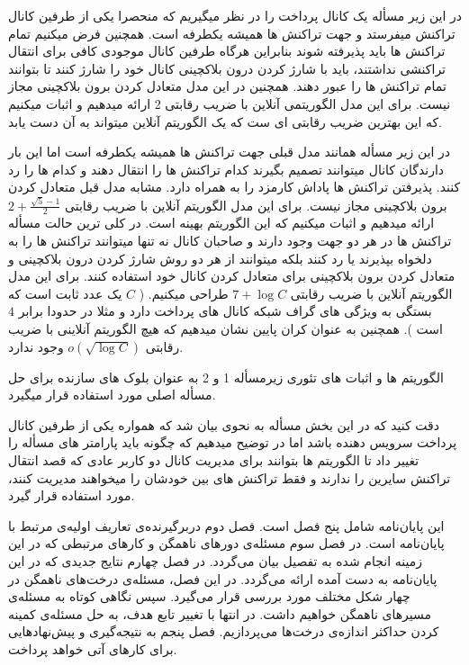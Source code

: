  در این زیر مسأله یک کانال پرداخت را در نظر میگیریم که منحصرا یکی از طرفین کانال  تراکنش میفرستد و جهت تراکنش ها همیشه یکطرفه است. همچنین فرض میکنیم تمام تراکنش ها باید پذیرفته شوند بنابراین هرگاه طرفین کانال موجودی کافی برای انتقال تراکنشی نداشتند، باید با  شارژ کردن درون بلاکچینی کانال خود را شارژ کنند تا بتوانند تمام تراکنش ها را عبور دهند. همچنین در این مدل متعادل کردن برون بلاکچینی مجاز نیست. برای این مدل الگوریتمی آنلاین با ضریب رقابتی  2 ارائه میدهیم و اثبات میکنیم که این بهترین ضریب رقابتی ای ست که یک الگوریتم آنلاین میتواند به آن دست یابد.

در این زیر مسأله همانند مدل قبلی جهت تراکنش ها همیشه یکطرفه است اما این بار دارندگان کانال میتوانند تصمیم بگیرند کدام تراکنش ها را انتقال دهند و کدام ها را رد کنند. پذیرفتن تراکنش ها پاداش کارمزد را به همراه دارد. مشابه مدل قبل
متعادل کردن برون بلاکچینی مجاز نیست. برای این مدل الگوریتم آنلاین با ضریب رقابتی
$2+\frac{\sqrt{5}-1}{2}$  
ارائه میدهیم و اثبات میکنیم که این الگوریتم بهینه است.
در کلی ترین حالت مسأله تراکنش ها در هر دو جهت وجود دارند و صاحبان کانال نه تنها میتوانند تراکنش ها را به دلخواه بپذیرند یا رد کنند بلکه میتوانند از هر دو روش شارژ کردن درون بلاکچینی و متعادل کردن برون بلاکچینی برای متعادل کردن کانال خود استفاده کنند. برای این مدل الگوریتم آنلاین با ضریب رقابتی
 $7+\log{C}$
طراحی میکنیم.
(
$C$
یک عدد ثابت است که بستگی به ویژگی های گراف شبکه کانال های پرداخت دارد و مثلا در  حدودا برابر $4$ است
). 
همچنین به عنوان کران پایین نشان میدهیم که هیچ الگوریتم آنلاینی با ضریب رقابتی 
$o(\sqrt{\log{C}})$
 وجود ندارد.

الگوریتم ها و اثبات های تئوری زیرمسأله 1 و 2 به عنوان بلوک های سازنده برای حل مسأله اصلی مورد استفاده قرار میگیرد. 

دقت کنید که در این بخش مسأله به نحوی بیان شد که همواره یکی از طرفین کانال پرداخت سرویس دهنده باشد اما در  توضیح میدهیم که چگونه باید پارامتر های مسأله را تغییر داد تا الگوریتم ها بتوانند برای مدیریت کانال دو کاربر عادی که قصد انتقال تراکنش سایرین را ندارند و فقط تراکنش های بین خودشان را میخواهند مدیریت کنند، مورد استفاده قرار گیرد.



این پایان‌نامه شامل پنج فصل است. 
فصل دوم دربرگیرنده‌ی تعاریف اولیه‌ی مرتبط با پایان‌نامه است. 
در فصل سوم مسئله‌ی دورهای ناهمگن و کارهای مرتبطی که در این زمینه انجام شده به تفصیل بیان می‌گردد. 
در فصل چهارم نتایج جدیدی که در این پایان‌نامه به دست آمده ارائه می‌گردد. در این فصل، مسئله‌ی درخت‌های ناهمگن در چهار شکل مختلف مورد بررسی قرار می‌گیرد. سپس نگاهی کوتاه به مسئله‌ی مسیرهای ناهمگن خواهیم داشت. در انتها با تغییر تابع هدف، به حل مسئله‌ی کمینه کردن حداکثر اندازه‌ی درخت‌ها می‌پردازیم.
فصل پنجم به نتیجه‌گیری و پیش‌نهادهایی برای کارهای آتی خواهد پرداخت.
